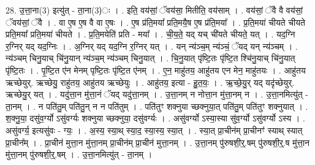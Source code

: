 \documentclass[17pt]{extarticle}
\begin{document}
28. उ॒त्ता॒ना(3) इत्यु॑त् - ता॒ना(3)ः । . इति॒ वय॑सां॒ ॅवय॑सा॒ मितीति॒ वय॑साम् । . वय॑सां॒ ॅवै वै वय॑सां॒ ॅवय॑सां॒ ॅवै । . वा ए॒ष ए॒ष वै वा ए॒षः । . ए॒ष प्र॑ति॒मया᳚ प्रति॒मयै॒ष ए॒ष प्र॑ति॒मया᳚ । . प्र॒ति॒मया॑ चीयते चीयते प्रति॒मया᳚ प्रति॒मया॑ चीयते । . प्र॒ति॒मयेति॑ प्रति - मया᳚ । . ची॒य॒ते॒ यद् यच् ची॑यते चीयते॒ यत् । . यद॒ग्नि र॒ग्निर् यद् यद॒ग्निः । . अ॒ग्निर् यद् यद॒ग्नि र॒ग्निर् यत् । . यन् न्य॑ञ्च॒म् न्य॑ञ्चं॒ ॅयद् यन् न्य॑ञ्चम् । . न्य॑ञ्चम् चिनु॒याच् चि॑नु॒यान् न्य॑ञ्च॒म् न्य॑ञ्चम् चिनु॒यात् । . चि॒नु॒यात् पृ॑ष्टि॒तः पृ॑ष्टि॒त श्चि॑नु॒याच् चि॑नु॒यात् पृ॑ष्टि॒तः । . पृ॒ष्टि॒त ए॑न मेनम् पृष्टि॒तः पृ॑ष्टि॒त ए॑नम् । . ए॒न॒ माहु॑तय॒ आहु॑तय एन मेन॒ माहु॑तयः । . आहु॑तय ऋच्छेयुर्. ऋच्छेयु॒ राहु॑तय॒ आहु॑तय ऋच्छेयुः । . आहु॑तय॒ इत्या - हु॒त॒यः॒ । . ऋ॒च्छे॒यु॒र् यद् यदृ॑च्छेयुर्. ऋच्छेयु॒र् यत् । . यदु॑त्ता॒न मु॑त्ता॒नं ॅयद् यदु॑त्ता॒नम् । . उ॒त्ता॒नम् न नोत्ता॒न मु॑त्ता॒नम् न । . उ॒त्ता॒नमित्यु॑त् - ता॒नम् । . न पति॑तु॒म् पति॑तु॒न् न न पति॑तुम् । . पति॑तुꣳ शक्नुया च्छक्नुया॒त् पति॑तु॒म् पति॑तुꣳ शक्नुयात् । . श॒क्नु॒या॒ दसु॑व॒र्ग्यो ऽसु॑वर्ग्यः शक्नुया च्छक्नुया॒ दसु॑वर्ग्यः । . असु॑वर्ग्यो ऽस्या॒स्या सु॑व॒र्ग्यो ऽसु॑वर्ग्यो ऽस्य । . असु॑वर्ग्य॒ इत्यसु॑वः - ग्यः॒ । . अ॒स्य॒ स्या॒थ् स्या॒द॒ स्या॒स्य॒ स्या॒त् । . स्या॒त् प्रा॒चीन॑म् प्रा॒चीनꣳ॑ स्याथ् स्यात् प्रा॒चीन᳚म् । . प्रा॒चीन॑ मुत्ता॒न मु॑त्ता॒नम् प्रा॒चीन॑म् प्रा॒चीन॑ मुत्ता॒नम् । . उ॒त्ता॒नम् पु॑रुषशी॒र्॒.षम् पु॑रुषशी॒र्॒.ष मु॑त्ता॒न मु॑त्ता॒नम् पु॑रुषशी॒र्॒.षम् । . उ॒त्ता॒नमित्यु॑त् - ता॒नम् । \newline
\end{document}
